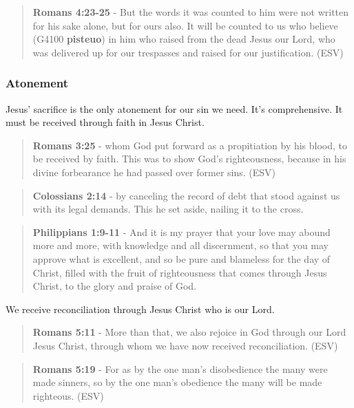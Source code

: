 \documentclass[11pt]{article}
\begin{document}
\begin{quote}
\textbf{Romans 4:23-25} - But the words it was counted to him were not written for his sake alone, but for ours also. It will be counted to us who believe (G4100 \textbf{pisteuo}) in him who raised from the dead Jesus our Lord, who was delivered up for our trespasses and raised for our justification. (ESV)
\end{quote}

\subsubsection{Atonement}
\label{sec:org31aa429}
Jesus' sacrifice is the only atonement for our sin we need. It's comprehensive.
It must be received through faith in Jesus Christ.

\begin{quote}
\textbf{Romans 3:25} -  whom God put forward as a propitiation by his blood, to be received by faith.  This was to show God's righteousness, because in his divine forbearance he had passed over former sins.  (ESV)
\end{quote}

\begin{quote}
\textbf{Colossians 2:14} - by canceling the record of debt that stood against us with its legal demands. This he set aside, nailing it to the cross.
\end{quote}

\begin{quote}
\textbf{Philippians 1:9-11} - And it is my prayer that your love may abound more and more, with knowledge and all discernment, so that you may approve what is excellent, and so be pure and blameless for the day of Christ, filled with the fruit of righteousness that comes through Jesus Christ, to the glory and praise of God.
\end{quote}

We receive reconciliation through Jesus Christ who is our Lord.

\begin{quote}
\textbf{Romans 5:11} - More than that, we also rejoice in God through our Lord Jesus Christ, through whom we have now received reconciliation. (ESV)
\end{quote}

\begin{quote}
\textbf{Romans 5:19} - For as by the one man's disobedience the many were made sinners, so by the one man's obedience the many will be made righteous. (ESV)
\end{quote}
\end{document}
